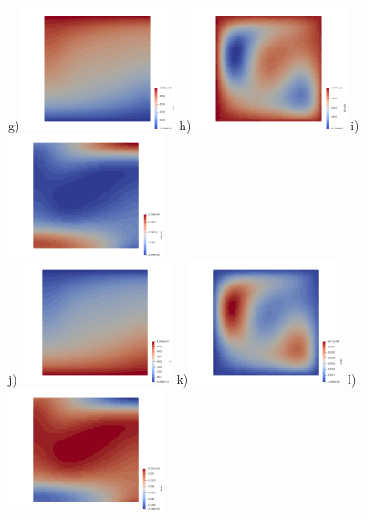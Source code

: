 \begin{center}
g)\includegraphics[width=4.5cm]{python_codes/fieldstone_compressible2/EBA_104/rho.png}  
h)\includegraphics[width=4.5cm]{python_codes/fieldstone_compressible2/EBA_104/drhodx.png}  
i)\includegraphics[width=4.5cm]{python_codes/fieldstone_compressible2/EBA_104/drhody.png} \\ 
j)\includegraphics[width=4.5cm]{python_codes/fieldstone_compressible2/EBA_104/T.png} 
k)\includegraphics[width=4.5cm]{python_codes/fieldstone_compressible2/EBA_104/dTdx.png}
l)\includegraphics[width=4.5cm]{python_codes/fieldstone_compressible2/EBA_104/dTdy.png}  \\

\end{center}
